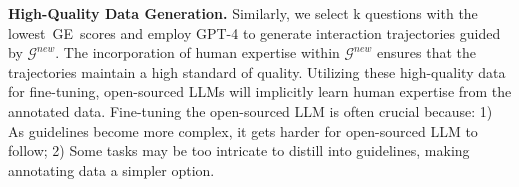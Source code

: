 \textbf{High-Quality Data Generation.} Similarly, we select k questions with the lowest GE scores and employ GPT-4 to generate interaction trajectories guided by $\mathcal{G}^{new}$. The incorporation of human expertise within $\mathcal{G}^{new}$ ensures that the trajectories  maintain a high standard of quality. Utilizing these high-quality data for fine-tuning, open-sourced LLMs will implicitly learn human expertise from the annotated data. Fine-tuning the open-sourced LLM is often crucial because: 1) As guidelines become more complex, it gets harder for open-sourced LLM to follow; 2) Some tasks may be too intricate to distill into guidelines, making annotating data a simpler option.

